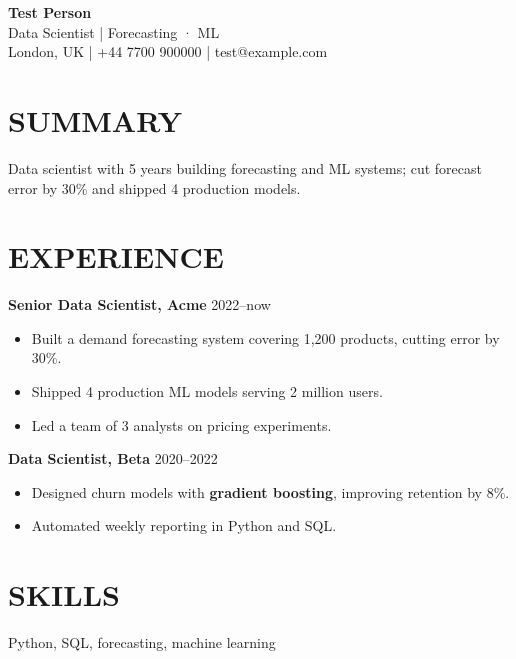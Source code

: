 \documentclass[10pt]{article}
\begin{document}
\begin{center}{\Large\textbf{Test Person}}\\
{\small Data Scientist | Forecasting · ML}\\[2pt]
{\small London, UK | +44 7700 900000 | test@example.com}
\end{center}
\section*{SUMMARY}
{\small Data scientist with 5 years building forecasting and ML systems; cut forecast error by 30\% and shipped 4 production models.}
\section*{EXPERIENCE}
\textbf{Senior Data Scientist, Acme} \hfill 2022--now
\begin{itemize}\small
\item Built a demand forecasting system covering 1,200 products, cutting error by 30\%.
\item Shipped 4 production ML models serving 2 million users.
\item Led a team of 3 analysts on pricing experiments.
\end{itemize}
\textbf{Data Scientist, Beta} \hfill 2020--2022
\begin{itemize}\small
\item Designed churn models with \textbf{gradient boosting}, improving retention by 8\%.
\item Automated weekly reporting in Python and SQL.
\end{itemize}
\section*{SKILLS}
{\small Python, SQL, forecasting, machine learning}
\end{document}
